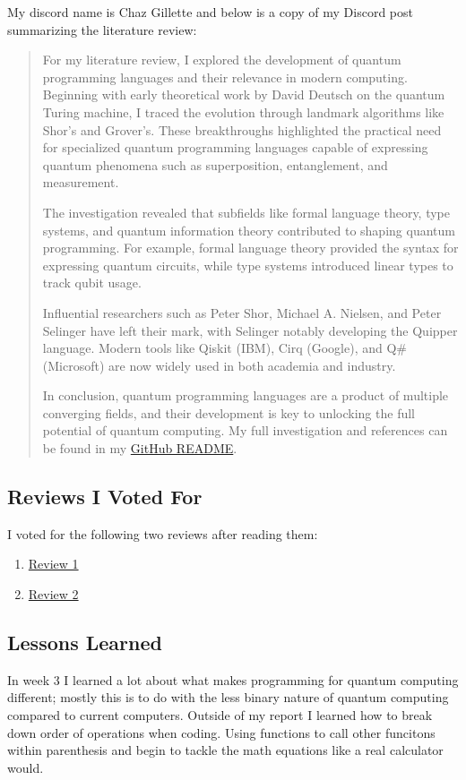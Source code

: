 \documentclass{article}
\begin{document}
My discord name is Chaz Gillette and below is a copy of my Discord post summarizing the literature review:

\begin{quote}
For my literature review, I explored the development of quantum programming languages and their relevance in modern computing. Beginning with early theoretical work by David Deutsch on the quantum Turing machine, I traced the evolution through landmark algorithms like Shor’s and Grover’s. These breakthroughs highlighted the practical need for specialized quantum programming languages capable of expressing quantum phenomena such as superposition, entanglement, and measurement.

The investigation revealed that subfields like formal language theory, type systems, and quantum information theory contributed to shaping quantum programming. For example, formal language theory provided the syntax for expressing quantum circuits, while type systems introduced linear types to track qubit usage.

Influential researchers such as Peter Shor, Michael A. Nielsen, and Peter Selinger have left their mark, with Selinger notably developing the Quipper language. Modern tools like Qiskit (IBM), Cirq (Google), and Q\# (Microsoft) are now widely used in both academia and industry.

In conclusion, quantum programming languages are a product of multiple converging fields, and their development is key to unlocking the full potential of quantum computing. My full investigation and references can be found in my \href{https://github.com/cgillette25/CPSC-354/blob/main/week3/README.md}{GitHub README}.
\end{quote}

\subsection*{Reviews I Voted For}
I voted for the following two reviews after reading them:

\begin{enumerate}
    \item \href{https://github.com/mdrivas/CPSC353-Assignment3/blob/main/README.md}{Review 1}
    \item \href{https://github.com/ATacoDev/LitReview354}{Review 2}
\end{enumerate}

\subsection*{Lessons Learned}
In week 3 I learned a lot about what makes programming for quantum computing different; mostly this is to do with the less binary nature of quantum computing compared to current computers. Outside of my report I learned how to break down order of operations when coding. Using functions to call other funcitons within parenthesis and begin to tackle the math equations like a real calculator would. 
\end{document}
